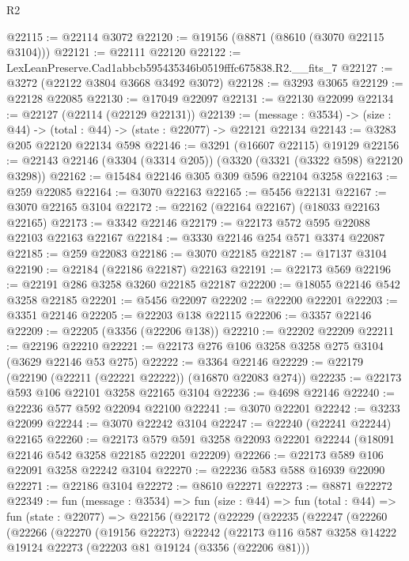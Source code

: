 \begin{lexlean}{R2}
\begin{coremodule}
@22115 := @22114 @3072
@22120 := @19156 (@8871 (@8610 (@3070 @22115 @3104)))
@22121 := @22111 @22120
@22122 := LexLeanPreserve.Cad1abbcb595435346b0519fffc675838.R2.__fits_7
@22127 := @3272 (@22122 @3804 @3668 @3492 @3072)
@22128 := @3293 @3065
@22129 := @22128 @22085
@22130 := @17049 @22097
@22131 := @22130 @22099
@22134 := @22127 (@22114 (@22129 @22131))
@22139 := (message : @3534) -> (size : @44) -> (total : @44) -> (state : @22077) -> @22121 @22134
@22143 := @3283 @205 @22120 @22134 @598
@22146 := @3291 (@16607 @22115) @19129
@22156 := @22143 @22146 (@3304 (@3314 @205)) (@3320 (@3321 (@3322 @598) @22120 @3298))
@22162 := @15484 @22146 @305 @309 @596 @22104 @3258
@22163 := @259 @22085
@22164 := @3070 @22163
@22165 := @5456 @22131
@22167 := @3070 @22165 @3104
@22172 := @22162 (@22164 @22167) (@18033 @22163 @22165)
@22173 := @3342 @22146
@22179 := @22173 @572 @595 @22088 @22103 @22163 @22167
@22184 := @3330 @22146 @254 @571 @3374 @22087
@22185 := @259 @22083
@22186 := @3070 @22185
@22187 := @17137 @3104
@22190 := @22184 (@22186 @22187) @22163
@22191 := @22173 @569
@22196 := @22191 @286 @3258 @3260 @22185 @22187
@22200 := @18055 @22146 @542 @3258 @22185
@22201 := @5456 @22097
@22202 := @22200 @22201
@22203 := @3351 @22146
@22205 := @22203 @138 @22115
@22206 := @3357 @22146
@22209 := @22205 (@3356 (@22206 @138))
@22210 := @22202 @22209
@22211 := @22196 @22210
@22221 := @22173 @276 @106 @3258 @3258 @275 @3104 (@3629 @22146 @53 @275)
@22222 := @3364 @22146
@22229 := @22179 (@22190 (@22211 (@22221 @22222)) (@16870 @22083 @274))
@22235 := @22173 @593 @106 @22101 @3258 @22165 @3104
@22236 := @4698 @22146
@22240 := @22236 @577 @592 @22094 @22100
@22241 := @3070 @22201
@22242 := @3233 @22099
@22244 := @3070 @22242 @3104
@22247 := @22240 (@22241 @22244) @22165
@22260 := @22173
    @579
    @591
    @3258
    @22093
    @22201
    @22244
    (@18091 @22146 @542 @3258 @22185 @22201 @22209)
@22266 := @22173 @589 @106 @22091 @3258 @22242 @3104
@22270 := @22236 @583 @588 @16939 @22090
@22271 := @22186 @3104
@22272 := @8610 @22271
@22273 := @8871 @22272
@22349 := fun (message : @3534) =>
  fun (size : @44) =>
  fun (total : @44) =>
  fun (state : @22077) =>
  @22156
    (@22172
      (@22229
        (@22235
          (@22247
            (@22260
              (@22266
                (@22270
                  (@19156 @22273)
                  @22242
                  (@22173
                    @116
                    @587
                    @3258
                    @14222
                    @19124
                    @22273
                    (@22203 @81 @19124 (@3356 (@22206 @81)))

\end{coremodule}
\end{lexlean}
